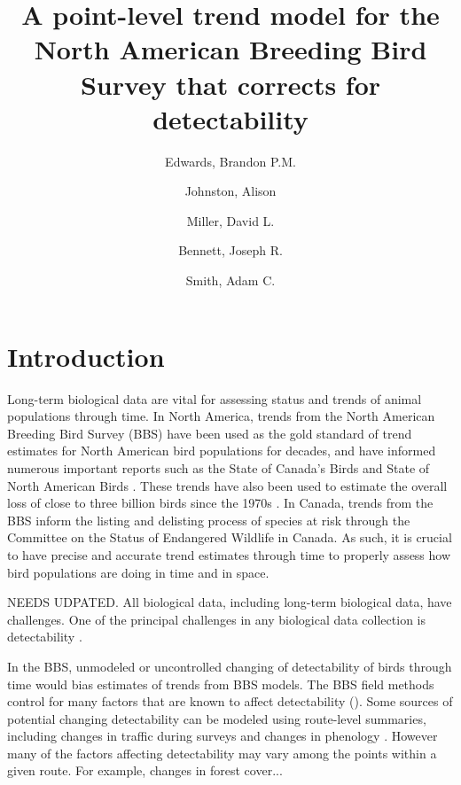 \documentclass[12pt]{article}
\title{A point-level trend model for the North American Breeding Bird Survey that corrects for detectability}
\author{
	Edwards, Brandon P.M.\\
	\and
	Johnston, Alison\\
	\and
	Miller, David L.\\
	\and
	Bennett, Joseph R.\\
	\and
	Smith, Adam C.\\
}
\begin{document}
	
	\maketitle
	
		
	
\section{Introduction}

\par Long-term biological data are vital for assessing status and trends of animal populations through time.
In North America, trends from the North American Breeding Bird Survey (BBS) \citep{sauer_first_2017, hudson_role_2017} have been used as the gold standard of trend estimates for North American bird populations for decades, and have informed numerous important reports such as the State of Canada's Birds \citep{north_american_bird_conservation_initiative_canada_state_2019} and State of North American Birds \citep{north_american_bird_conservation_initiative_canada_state_2022}.
These trends have also been used to estimate the overall loss of close to three billion birds since the 1970s \citep{rosenberg_decline_2019}.
In Canada, trends from the BBS inform the listing and delisting process of species at risk through the Committee on the Status of Endangered Wildlife in Canada.
As such, it is crucial to have precise and accurate trend estimates through time to properly assess how bird populations are doing in time and in space.

\par NEEDS UDPATED. All biological data, including long-term biological data, have challenges. 
One of the principal challenges in any biological data collection is detectability \citep{bennett_how_2024}.
\par In the BBS, unmodeled or uncontrolled changing of detectability of birds through time would bias estimates of trends from BBS models.
The BBS field methods control for many factors that are known to affect detectability ().
Some sources of potential changing detectability can be modeled using route-level summaries, including changes in traffic during surveys and changes in phenology \citep{griffith_traffic_2010}.
However many of the factors affecting detectability may vary among the points within a given route.
For example, changes in forest cover...
\end{document}
